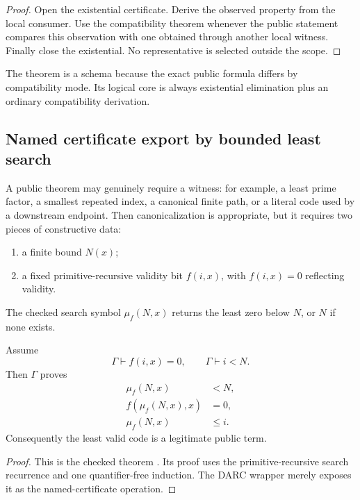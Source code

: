 \begin{proof}
Open the existential certificate.  Derive the observed property from the local
consumer.  Use the compatibility theorem whenever the public statement
compares this observation with one obtained through another local witness.
Finally close the existential.  No representative is selected outside the
scope.
\end{proof}

The theorem is a schema because the exact public formula differs by
compatibility mode.  Its logical core is always existential elimination plus
an ordinary compatibility derivation.

\subsection{Named certificate export by bounded least search}

A public theorem may genuinely require a witness: for example, a least prime
factor, a smallest repeated index, a canonical finite path, or a literal code
used by a downstream endpoint.  Then canonicalization is appropriate, but it
requires two pieces of constructive data:
\begin{enumerate}
  \item a finite bound \(N(x)\);
  \item a fixed primitive-recursive validity bit \(f(i,x)\), with
        \(f(i,x)=0\) reflecting validity.
\end{enumerate}
The checked search symbol \(\mu_f(N,x)\) returns the least zero below \(N\), or
\(N\) if none exists.

\begin{theorem}
\label{thm:named-export}
Assume
\[
  \Gamma\vdash f(i,x)=0,
  \qquad
  \Gamma\vdash i<N.
\]
Then \(\Gamma\) proves
\begin{align*}
  \mu_f(N,x)&<N,\\
  f(\mu_f(N,x),x)&=0,\\
  \mu_f(N,x)&\le i.
\end{align*}
Consequently the least valid code is a legitimate public term.
\end{theorem}

\begin{proof}
This is the checked theorem .  Its proof uses the
primitive-recursive search recurrence and one quantifier-free induction.  The
DARC wrapper merely exposes it as the named-certificate operation.
\end{proof}


